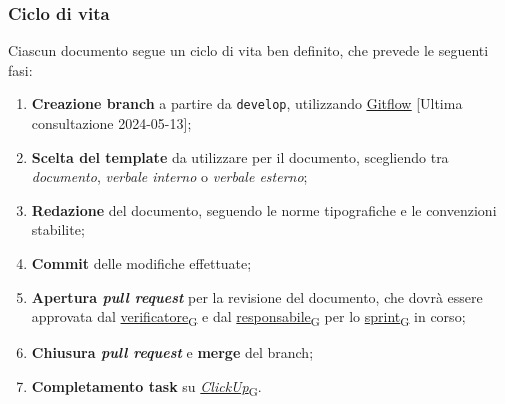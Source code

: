\subsubsection{Ciclo di vita}
Ciascun documento segue un ciclo di vita ben definito, che prevede le seguenti fasi:
\begin{enumerate}
	\item \textbf{Creazione branch} a partire da \texttt{develop}, utilizzando \href{https://www.atlassian.com/git/tutorials/comparing-workflows/gitflow-workflow}{\underline{Gitflow}} [Ultima consultazione 2024-05-13];
	\item \textbf{Scelta del template} da utilizzare per il documento, scegliendo tra \textit{documento}, \textit{verbale interno} o \textit{verbale esterno};
	\item \textbf{Redazione} del documento, seguendo le norme tipografiche e le convenzioni stabilite;
	\item \textbf{Commit} delle modifiche effettuate;
	\item \textbf{Apertura \textit{pull request}} per la revisione del documento, che dovrà essere approvata dal \href{https://7last.github.io/docs/pb/documentazione-interna/glossario\#verificatore}{verificatore\textsubscript{G}} e dal \href{https://7last.github.io/docs/pb/documentazione-interna/glossario\#responsabile}{responsabile\textsubscript{G}} per lo \href{https://7last.github.io/docs/pb/documentazione-interna/glossario\#sprint}{sprint\textsubscript{G}} in corso;
	\item \textbf{Chiusura \textit{pull request}} e \textbf{merge} del branch;
	\item \textbf{Completamento task} su \href{https://7last.github.io/docs/pb/documentazione-interna/glossario\#clickup}{\textit{ClickUp}\textsubscript{G}}.
\end{enumerate}

